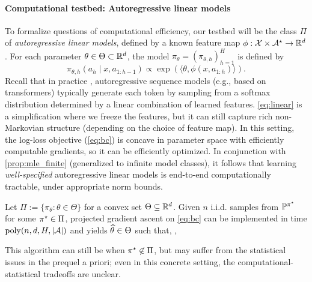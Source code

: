 \paragraph{Computational testbed: Autoregressive linear models}
To formalize questions of computational efficiency, our testbed 
will be the class $\Pi$ of \emph{autoregressive linear models}, defined by a known feature map $\phi: \mathcal{X} \times \mathcal{A}^\star \to \mathbb{R}^d$. For each parameter $\theta \in\Theta\subset \mathbb{R}^d$, the model $\pi_\theta=(\pi_{\theta,h})_{h=1}^H$ is defined by 
\begin{equation}
  \label{eq:linear}
  \pi_{\theta,h}(a_h\mid{}x,a_{1:h-1}) \propto \exp(\langle \theta,
    \phi(x,a_{1:h})\rangle).
\end{equation}
Recall that in practice \citep{radford2019language}, autoregressive
sequence models (e.g., based on transformers) typically generate each token by sampling from a
softmax distribution determined by a linear combination of learned
features. \cref{eq:linear} is a simplification
where we freeze the features, but it can still capture rich
non-Markovian structure (depending on the choice of feature map).
In this setting, the log-loss objective (\cref{eq:bc}) is concave in parameter space with efficiently computable
gradients, so it can be efficiently optimized. In conjunction with \cref{prop:mle_finite} (generalized to infinite model classes), it follows that learning \emph{well-specified} autoregressive linear models is end-to-end computationally tractable, under appropriate norm bounds.

\begin{proposition}\label{prop:gdlogloss-intro}
Let $\Pi := \{\pi_\theta: \theta\in\Theta\}$ for a convex set $\Theta\subseteq \mathbb{R}^d$. Given $n$ i.i.d. samples from $\mathbb{P}^{\pi^{\star}}$ for some $\pi^{\star} \in\Pi$, projected gradient ascent on \cref{eq:bc} can be implemented in time $\mathrm{poly}(n,d,H,|\mathcal{A}|)$ and yields $\widehat{\theta} \in \Theta$ such that, , %
\end{proposition}

This algorithm can still be  when $\pi^{\star} \not
\in \Pi$, but may suffer from the statistical issues in the
prequel a priori; even in this concrete setting, the computational-statistical tradeoffs are unclear.





